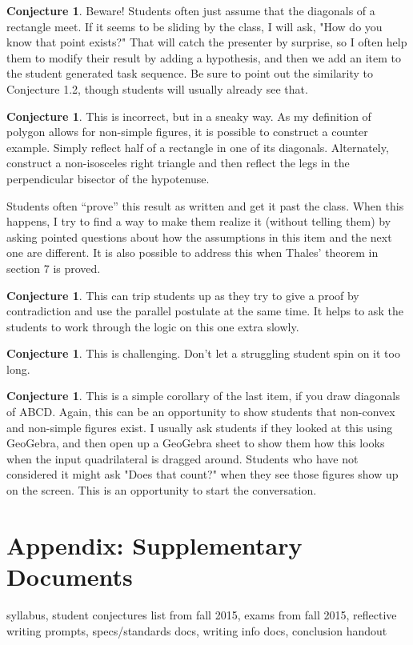 \documentclass{tufte-handout}
\theoremstyle{definition}
\newtheorem{conjecture}[problem]{Conjecture}
\begin{document}
\begin{conjecture}
Beware! Students often just assume that the diagonals of a rectangle meet. If it seems to be sliding by the class, I will ask, "How do you know that point exists?" That will catch the presenter by surprise, so I often help them to modify their result by adding a hypothesis, and then we add an item to the student generated task sequence. Be sure to point out the similarity to Conjecture 1.2, though students will usually already see that.
\end{conjecture}

\begin{conjecture}
This is incorrect, but in a sneaky way. As my definition of polygon allows for non-simple figures, it is possible to construct a counter example. Simply reflect half of a rectangle in one of its diagonals. Alternately, construct a non-isosceles right triangle and then reflect the legs in the perpendicular bisector of the hypotenuse.

Students often ``prove'' this result as written and get it past the class. When this happens, I try to find a way to make them realize it (without telling them) by asking pointed questions about how the assumptions in this item and the next one are different. 
It is also possible to address this when Thales' theorem in section 7 is proved.
\end{conjecture}

\begin{conjecture}
This can trip students up as they try to give a proof by contradiction and use the parallel postulate at the same time. It helps to ask the students to work through the logic on this one extra slowly.
\end{conjecture}

\begin{conjecture}
This is challenging. Don't let a struggling student spin on it too long.
\end{conjecture}


\begin{conjecture}
This is a simple corollary of the last item, if you draw diagonals of ABCD. Again, this can be an opportunity to show students that non-convex and non-simple figures exist. I usually ask students if they looked at this using GeoGebra, and then open up a GeoGebra sheet to show them how this looks when the input quadrilateral is dragged around. Students who have not considered it might ask "Does that count?" when they see those figures show up on the screen. This is an opportunity to start the conversation.
\end{conjecture}

\clearpage
\section{Appendix: Supplementary Documents}

syllabus, student conjectures list from fall 2015, exams from fall 2015, reflective writing prompts, specs/standards docs, writing info docs, conclusion handout
\end{document}
